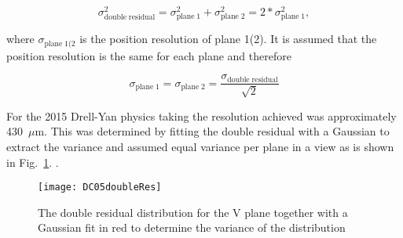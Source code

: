 \begin{equation}
\sigma_{\mathrm{double \; residual}}^2 = \sigma_{\mathrm{plane \; 1}}^2 +
\sigma_{\mathrm{plane \; 2}}^2 = 2*\sigma_{\mathrm{plane \; 1}}^2,
\end{equation}

\noindent
where $\sigma_{\mathrm{plane \; 1(2}}$ is the position resolution of plane 1(2).
It is assumed that the position resolution is the same for each plane and
therefore

\begin{equation}
\sigma_{\mathrm{plane \; 1}} = \sigma_{\mathrm{plane \; 2}} =
\frac{\sigma_{\mathrm{double \; residual}}}{\sqrt{2}}
\end{equation}

\noindent
For the 2015 Drell-Yan physics taking the resolution achieved was
approximately 430~$\mu$m. This was determined by fitting the double residual
with a Gaussian to extract the variance and assumed equal variance per plane in
a view as is shown in Fig.~\ref{fig::DC05doubleRes}.
.

\begin{figure}[h!t]
  \centering \texttt{[image: DC05doubleRes]}
  \caption{The double residual distribution for the V plane together with a
    Gaussian fit in red to determine the variance of the distribution}
  \label{fig::DC05doubleRes}
\end{figure}



